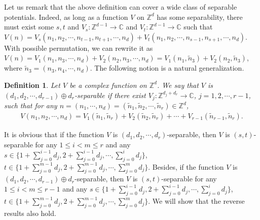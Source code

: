 \documentclass[12pt,letterpaper]{amsart}
\newtheorem{definition}{Definition}[section]
\def\C{{\mathbb C}}
\def\Z{{\mathbb Z}}
\begin{document}
{Let us remark that the above definition can cover a wide class of separable potentials. Indeed, as long as a function $V$ on $\Z^d$ has some separability, there must exist some $s,t$ and $V_s:\Z^{d-1}\to\C$ and $V_t:\Z^{d-1}\to\C$ such that {$V(n)=V_s({n}_1,{n}_2,\cdots,{n}_{t-1},{n}_{t+1},\cdots,{n}_d)+V_t({n}_1,{n}_2,\cdots,{n}_{s-1},{n}_{s+1},\cdots,{n}_d).$ With possible permutation}, we can rewrite it as $V(n)=V_1(n_1,n_3,\cdots,n_d)+V_2(n_2,n_3,\cdots,n_d)=V_1(n_1,\tilde{n}_3)+V_2(n_2,\tilde{n}_3)$, where $\tilde{n}_3=(n_3,n_4,\cdots,n_d)$.
	The following notion is a natural generalization.

\begin{definition}\label{defstseptilde}
	Let $V$ be a complex function on $\Z^d$. We say that $V$ is $(d_1,d_2,\cdots,d_{r-1})\oplus d_r$-separable if there exist $V_{j}:\mathbb{Z}^{d_j+d_r}\to\mathbb{C}$, $j=1,2,\cdots,r-1$, such that for any $n=(n_1,\cdots,n_d)=(\tilde{n}_1,\tilde{n}_2,\cdots,\tilde{n}_r)\in\mathbb{Z}^d$,
	\begin{align}
		V(n_1,n_2,\cdots,n_d)=V_1(\tilde{n}_1,\tilde{n}_r)+V_2(\tilde{n}_2,\tilde{n}_r)+\cdots+V_{r-1}(\tilde{n}_{r-1},\tilde{n}_r).\nonumber
\end{align}\end{definition}
}

It is obvious that if the function $V$ is $(d_1,d_2,\cdots,d_r)$-separable, then $V$ is $(s,t)$-separable for any $1\leq i<m\leq r$ and any $s\in \{1+\sum_{j=0}^{i-1}d_j,2+\sum_{j=0}^{i-1}d_j,\cdots,\sum_{j=0}^{i}d_j\}$, $t\in \{1+\sum_{j=0}^{m-1}d_j,2+\sum_{j=0}^{m-1}d_j,\cdots,\sum_{j=0}^{m}d_j\}$.
{Besides, if the function $V$ is $(d_1,d_2,\cdots,d_{r-1})\oplus d_r$-separable, then $V$ is $(s,t)$-separable for any $1\leq i<m\leq r-1$ and any $s\in \{1+\sum_{j=0}^{i-1}d_j,2+\sum_{j=0}^{i-1}d_j,\cdots,\sum_{j=0}^{i}d_j\}$, $t\in \{1+\sum_{j=0}^{m-1}d_j,2+\sum_{j=0}^{m-1}d_j,\cdots,\sum_{j=0}^{m}d_j\}$.
We will show that the reverse results also hold.}
\end{document}
